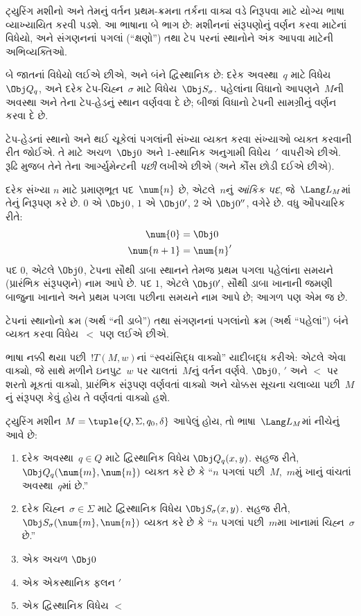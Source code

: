 \begin{explain}
ટ્યુરિંગ મશીનો અને તેમનું વર્તન પ્રથમ-ક્રમના તર્કના
વાક્ય વડે નિરૂપવા માટે યોગ્ય ભાષા વ્યાખ્યાયિત
કરવી પડશે. આ ભાષાના બે ભાગ છે: મશીનનાં સંરૂપણોનું
વર્ણન કરવા માટેનાં વિધેયો, અને સંગણનનાં પગલાં
(``ક્ષણો'') તથા ટેપ પરનાં સ્થાનોને અંક આપવા માટેની
અભિવ્યક્તિઓ.

બે જાતનાં વિધેયો લઈએ છીએ, અને બંને દ્વિસ્થાનિક
છે: દરેક અવસ્થા~$q$ માટે વિધેય~$\Obj Q_q$,
અને દરેક ટેપ-ચિહ્ન~$\sigma$ માટે
વિધેય~$\Obj S_\sigma$. પહેલાંના વિધાનો
આપણને~$M$ની અવસ્થા અને તેના ટેપ-હેડનું સ્થાન
વર્ણવવા દે છે; બીજાં વિધાનો ટેપની સામગ્રીનું વર્ણન
કરવા દે છે.

ટેપ-હેડનાં સ્થાનો અને થઈ ચૂકેલાં પગલાંની સંખ્યા
વ્યક્ત કરવા સંખ્યાઓ વ્યક્ત કરવાની રીત જોઈએ. તે માટે
અચળ~$\Obj 0$ અને $1$-સ્થાનિક અનુગામી
વિધેય~$\prime$ વાપરીએ છીએ. રૂઢિ મુજબ તેને તેના
આર્ગ્યુમેન્ટની \emph{પછી} લખીએ છીએ (અને કૌંસ
છોડી દઈએ છીએ).

દરેક સંખ્યા $n$ માટે પ્રમાણભૂત પદ~$\num{n}$ છે,
એટલે~$n$નું \emph{આંકિક પદ}, જે~$\Lang L_M$માં
તેનું નિરૂપણ કરે છે. $\num{0}$ એ $\Obj 0$,
$\num{1}$ એ $\Obj 0'$, $\num{2}$ એ $\Obj 0''$,
વગેરે છે. વધુ ઔપચારિક રીતે:
\begin{align*}
\num{0} & = \Obj 0 \\
\num{n+1} &= \num{n}'
\end{align*}
પદ $\num{0}$, એટલે $\Obj 0$, ટેપના સૌથી ડાબા
સ્થાનને તેમજ પ્રથમ પગલા પહેલાંના સમયને (પ્રારંભિક
સંરૂપણને) નામ આપે છે. પદ $\num{1}$, એટલે
$\Obj 0'$, સૌથી ડાબા ખાનાની જમણી બાજુના ખાનાને
અને પ્રથમ પગલા પછીના સમયને નામ આપે છે; આગળ
પણ એમ જ છે.

ટેપનાં સ્થાનોનો ક્રમ (અર્થ ``ની ડાબે'') તથા
સંગણનનાં પગલાંનો ક્રમ (અર્થ ``પહેલાં'') બંને વ્યક્ત
કરવા વિધેય~$<$ પણ લઈએ છીએ.

ભાષા નક્કી થયા પછી~$!T(M, w)$નાં ``સ્વયંસિદ્ધ વાક્યો''
યાદીબદ્ધ કરીએ: એટલે એવા વાક્યો, જે સાથે
મળીને ઇનપુટ~$w$ પર ચાલતાં~$M$નું વર્તન વર્ણવે.
$\Obj 0$, $\prime$ અને $<$ પર શરતો મૂકતાં વાક્યો,
પ્રારંભિક સંરૂપણ વર્ણવતાં વાક્યો અને ચોક્કસ સૂચના
ચલાવ્યા પછી~$M$નું સંરૂપણ કેવું હોય તે વર્ણવતાં
વાક્યો હશે.
\end{explain}

\begin{defn}
ટ્યુરિંગ મશીન $M = \tuple{Q, \Sigma, q_0, \delta}$
આપેલું હોય, તો ભાષા~$\Lang L_M$માં નીચેનું આવે છે:
\begin{enumerate}
\item દરેક અવસ્થા~$q \in Q$ માટે દ્વિસ્થાનિક
  વિધેય $\Obj Q_q(x, y)$. સહજ રીતે,
  $\Obj Q_q(\num{m}, \num{n})$ વ્યક્ત કરે છે કે
  ``$n$ પગલાં પછી~$M$,~$m$મું ખાનું વાંચતાં
  અવસ્થા~$q$માં છે.''
\item દરેક ચિહ્ન~$\sigma\in \Sigma$ માટે દ્વિસ્થાનિક
  વિધેય $\Obj S_\sigma(x, y)$. સહજ રીતે,
  $\Obj S_\sigma(\num{m}, \num{n})$ વ્યક્ત કરે છે કે
  ``$n$ પગલાં પછી~$m$મા ખાનામાં ચિહ્ન~$\sigma$ છે.''
\item એક અચળ $\Obj 0$
\item એક એકસ્થાનિક ફલન $\prime$
\item એક દ્વિસ્થાનિક વિધેય $<$
\end{enumerate}
\end{defn}

